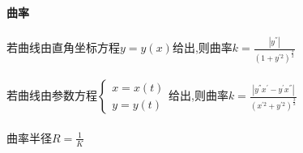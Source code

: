 \documentclass{article}
\begin{document}
\begin{flushleft}
	~\\ \textbf{曲率} \\~\\
	
	若曲线由直角坐标方程$y=y(x)$给出,则曲率$k=\frac{|y^{''}|}{(1+y^{'2})^{\frac{3}{2}}}$\\
	~\\
	若曲线由参数方程$\left\{
	\begin{array}{rcl}
	x=x(t)\\
	y=y(t)
	\end{array} \right.$给出,则曲率$k=\frac{|y^{''}x^{'}-y^{'}x^{''}|}{(x^{'2}+y^{'2})^{\frac{3}{2}}}$\\
	~\\
	曲率半径$R=\frac{1}{K}$\\
\end{flushleft}
\end{document}
